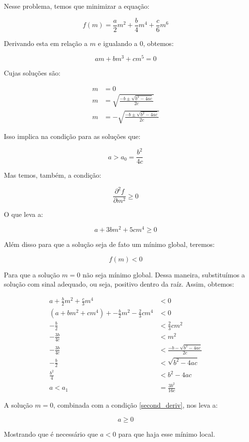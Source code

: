 Nesse problema, temos que minimizar a equação:

\begin{equation}
f(m) = \frac{a}{2} m^2 + \frac{b}{4} m^4 + \frac{c}{6} m^6
\end{equation}

Derivando esta em relação a $m$ e igualando a $0$, obtemos:

\begin{equation}
a m + b m^3 + c m^5 = 0
\end{equation}

Cujas soluções são:

\begin{subequations}
\begin{align}
m &= 0 \\
m &= \sqrt{\frac{-b \pm \sqrt{b^2 - 4ac}}{2c}} \\
m &= -\sqrt{\frac{-b \pm \sqrt{b^2 - 4ac}}{2c}}
\end{align}
\label{sols}
\end{subequations}

Isso implica na condição para as soluções que:

\begin{equation}
a > a_0 =\frac{b^2}{4c}
\end{equation}

Mas temos, também, a condição:

\begin{equation}
\frac{\partial^2 f}{\partial m^2} \geq 0
\label{second_deriv}
\end{equation}

O que leva a:

\begin{equation}
a + 3 b m^{2} + 5 c m^{4} \geq 0
\label{mincond}
\end{equation}


Além disso para que a solução seja de fato um mínimo global, teremos:

\begin{equation}
f(m) < 0
\end{equation}

Para que a solução $m=0$ não seja mínimo global. Dessa maneira, substituímos a solução com sinal adequado, ou seja, positivo dentro da raíz. Assim, obtemos:

\begin{equation}
\begin{split}
a + \frac{b}{2} m^2 + \frac{c}{3} m^4 &< 0 \\
\left( a+bm^2+cm^4 \right) + -\frac{b}{2}m^2 -\frac{2}{3}cm^4 &< 0 \\
-\frac{b}{2} &< \frac{2}{3} cm^2 \\
-\frac{3b}{4c} &< m^2 \\
-\frac{3b}{4c} &< \frac{-b-\sqrt{b^2-4ac}}{2c} \\
-\frac{b}{2} &< \sqrt{b^2-4ac} \\
\frac{b^2}{4} &< b^2 - 4ac \\
a < a_1 &= \frac{3b^2}{16c}
\end{split}
\label{p1_cond}
\end{equation}

A solução $m=0$, combinada com a condição \eqref{second_deriv}, nos leva a:

\begin{equation}
a \geq 0
\end{equation}

Mostrando que é necessário que $a<0$ para que haja esse mínimo local.